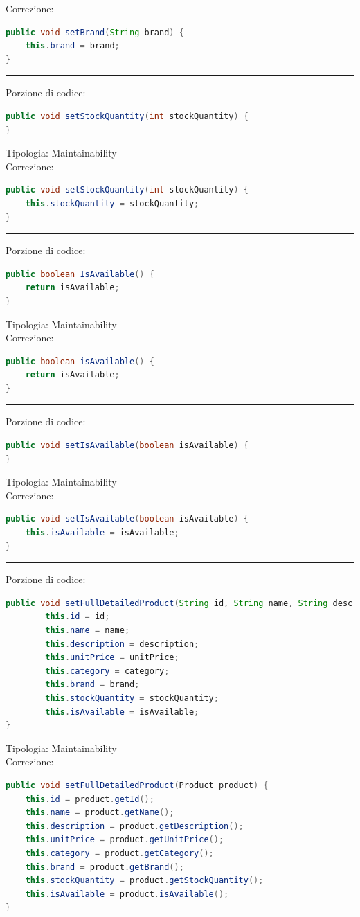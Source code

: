 \documentclass{article}
\begin{document}
Correzione:
\begin{lstlisting}[language=Java]
public void setBrand(String brand) {
    this.brand = brand;
}
\end{lstlisting}
\vspace{.5em}\hrule\vspace{.5em}
Porzione di codice:
\begin{lstlisting}[language=Java]
public void setStockQuantity(int stockQuantity) {
}
\end{lstlisting}
Tipologia: Maintainability\\
Correzione:
\begin{lstlisting}[language=Java]
public void setStockQuantity(int stockQuantity) {
    this.stockQuantity = stockQuantity;
}
\end{lstlisting}
\vspace{.5em}\hrule\vspace{.5em}
Porzione di codice:
\begin{lstlisting}[language=Java]
public boolean IsAvailable() {
    return isAvailable;
}
\end{lstlisting}
Tipologia: Maintainability\\
Correzione:
\begin{lstlisting}[language=Java]
public boolean isAvailable() {
    return isAvailable;
}
\end{lstlisting}
\vspace{.5em}\hrule\vspace{.5em}
Porzione di codice:
\begin{lstlisting}[language=Java]
public void setIsAvailable(boolean isAvailable) {
}
\end{lstlisting}
Tipologia: Maintainability\\
Correzione:
\begin{lstlisting}[language=Java]
public void setIsAvailable(boolean isAvailable) {
    this.isAvailable = isAvailable;
}
\end{lstlisting}
\vspace{.5em}\hrule\vspace{.5em}
Porzione di codice:
\begin{lstlisting}[language=Java]
public void setFullDetailedProduct(String id, String name, String description, double unitPrice, int category, String brand, int stockQuantity, boolean isAvailable) {
        this.id = id;
        this.name = name;
        this.description = description;
        this.unitPrice = unitPrice;
        this.category = category;
        this.brand = brand;
        this.stockQuantity = stockQuantity;
        this.isAvailable = isAvailable;
}
\end{lstlisting}
Tipologia: Maintainability\\
Correzione:
\begin{lstlisting}[language=Java]
public void setFullDetailedProduct(Product product) {
    this.id = product.getId();
    this.name = product.getName();
    this.description = product.getDescription();
    this.unitPrice = product.getUnitPrice();
    this.category = product.getCategory();
    this.brand = product.getBrand();
    this.stockQuantity = product.getStockQuantity();
    this.isAvailable = product.isAvailable();
}
\end{lstlisting}
\end{document}
